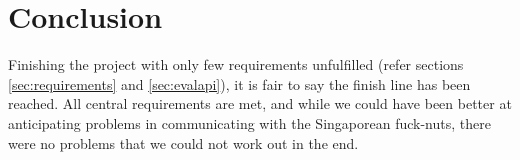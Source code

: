 \section{Conclusion}
Finishing the project with only few requirements unfulfilled (refer sections
\ref{sec:requirements} and \ref{sec:evalapi}), it is fair to say the finish
line has been reached. All central requirements are met, and while we could
have been better at anticipating problems in communicating with the Singaporean
fuck-nuts, there were no problems that we could not work out in the end.
